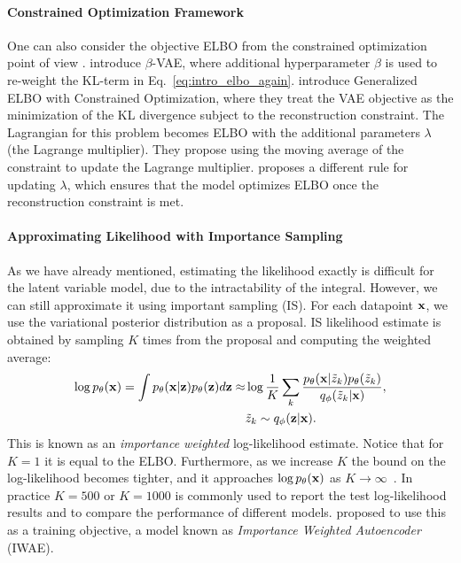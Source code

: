 \paragraph{Constrained Optimization Framework}
One can also consider the objective ELBO from the constrained optimization point of view \citep{higgins2017beta, rezende2018taming}. \citet{higgins2017beta} introduce $\beta$-VAE, where additional hyperparameter $\beta$ is used to re-weight the KL-term in Eq.~\ref{eq:intro_elbo_again}. \citet{rezende2018taming} introduce Generalized ELBO with Constrained Optimization, where they treat the VAE objective as the minimization of the KL divergence subject to the reconstruction constraint. The Lagrangian for this problem becomes ELBO with the additional parameters $\lambda$ (the Lagrange multiplier). They propose using the moving average of the constraint to update the Lagrange multiplier.
\citet{klushyn2019learning} proposes a different rule for updating $\lambda$, which ensures that the model optimizes ELBO once the reconstruction constraint is met. 

\paragraph{Approximating Likelihood with Importance Sampling}
As we have already mentioned, estimating the likelihood exactly is difficult for the latent variable model, due to the intractability of the integral. However, we can still approximate it using important sampling (IS). For each datapoint ${\mathbf{x}}$, we use the variational posterior distribution as a proposal. IS likelihood estimate is obtained by sampling $K$ times from the proposal and computing the weighted average:
\begin{equation}
\begin{aligned}
    \log p_{\theta}({\mathbf{x}}) = \int p_{\theta}({\mathbf{x}}|{\mathbf{z}})p_{\theta}({\mathbf{z}})d{\mathbf{z}} \approx &\log \frac1K \sum_k\frac{p_{\theta}({\mathbf{x}}|\tilde{z}_k)p_{\theta}(\tilde{z}_k)}{q_{\phi}(\tilde{z}_k|{\mathbf{x}})},\\
    &\tilde{z}_k \sim q_{\phi}({\mathbf{z}}|{\mathbf{x}}).
\end{aligned}
\end{equation}
This is known as an \textit{importance weighted} log-likelihood estimate. Notice that for $K=1$ it is equal to the ELBO. Furthermore, as we increase $K$ the bound on the log-likelihood becomes tighter, and it approaches $\log p_{\theta}({\mathbf{x}})$ as $K \rightarrow \infty$~\citep{burda2015importance}. In practice $K=500$ or $K=1000$ is commonly used to report the test log-likelihood results and to compare the performance of different models. \citet{burda2015importance} proposed to use this as a training objective, a model known as \textit{Importance Weighted Autoencoder} (IWAE). 

